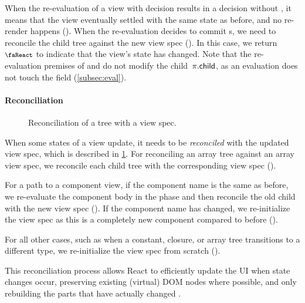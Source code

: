 When the re-evaluation of a view with  decision results in a decision without , it means that the view eventually settled with the same state as before, and no re-render happens ().
When the re-evaluation decides to commit s, we need to reconcile the child tree against the new view spec ().
In this case, we return $\rendermode$ to indicate that the view's state has changed.
Note that the re-evaluation premises of  and  do not modify the child~$\pi.\textup{\textsf{child}}$, as an evaluation does not touch the  field (\cref{subsec:eval}).


\paragraph{Reconciliation}
\begin{figure}[tb]
  \centering
  
  \caption{Reconciliation of a tree with a view spec.}\label{fig:reconcile}
\end{figure}
When some states of a view update, it needs to be \emph{reconciled} with the updated view spec, which is described in \cref{fig:reconcile}.
For reconciling an array tree against an array view spec, we reconcile each child tree with the corresponding view spec ().

For a path to a component view, if the component name is the same as before, we re-evaluate the component body in the  phase and then reconcile the old child with the new view spec ().
If the component name has changed, we re-initialize the view spec as this is a completely new component compared to before ().

For all other cases, such as when a constant, closure, or array tree transitions to a different type, we re-initialize the view spec from scratch ().

This reconciliation process allows React to efficiently update the UI when state changes occur, preserving existing (virtual) DOM nodes where possible, and only rebuilding the parts that have actually changed \citep{Cac16React}.


